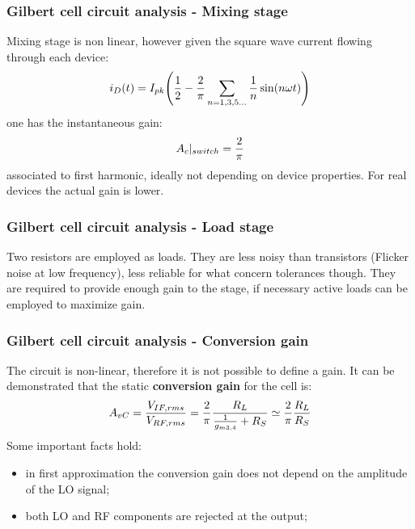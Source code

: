 \begin{frame}
	\frametitle{Gilbert cell circuit analysis - Mixing stage}
	Mixing stage is non linear, however given the square wave current flowing through each device:
	\begin{equation}
	i_D(t)=I_{pk}\Bigg(\frac{1}{2}-\frac{2}{\pi} \sum_{n=1,3,5 \dots}^{} \frac{1}{n}\sin(n\omega t)\Bigg) \notag
	\end{equation} 
	one has the instantaneous gain:
	\begin{equation}
	\label{eq_SwitchGain}
	A_c|_{switch} = \frac{2}{\pi} \notag
	\end{equation}
	associated to first harmonic, ideally not depending on device properties. For real devices the actual gain is lower.
\end{frame}

\begin{frame}
	\frametitle{Gilbert cell circuit analysis - Load stage}
	Two resistors are employed as loads. They are less noisy than transistors (Flicker noise at low frequency), less reliable for what concern tolerances though. They are required to provide enough gain to the stage, if necessary active loads can be employed to maximize gain.
\end{frame}

\begin{frame}
	\frametitle{Gilbert cell circuit analysis - Conversion gain}
	The circuit is non-linear, therefore it is not possible to define a gain. It can be demonstrated that the static \textbf{conversion gain} for the cell is:
	\begin{equation}
	\label{eq:ConvGain}
	A_{vC} = \frac{V_{IF,rms}}{V_{RF,rms}} =  \frac{2}{\pi}\frac{R_L}{\frac{1}{g_{m3,4}}+R_S} \simeq \frac{2}{\pi}\frac{R_L}{R_S} \notag
	\end{equation}
	Some important facts hold:
	\begin{itemize}
		\item in first approximation the conversion gain does not depend on the amplitude of the LO signal;
		\item both LO and RF components are rejected at the output;
	\end{itemize}  
\end{frame}